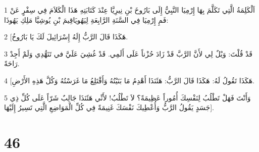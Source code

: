 \par 1 اَلْكَلِمَةُ الَّتِي تَكَلَّمَ بِهَا إِرْمِيَا النَّبِيُّ إِلَى بَارُوخَ بْنِ نِيرِيَّا عِنْدَ كَتَابَتِهِ هَذَا الْكَلاَمَ فِي سِفْرٍ عَنْ فَمِ إِرْمِيَا فِي السَّنَةِ الرَّابِعَةِ لِيَهُويَاقِيمَ بْنِ يُوشِيَّا مَلِكِ يَهُوذَا:
\par 2 [هَكَذَا قَالَ الرَّبُّ إِلَهُ إِسْرَائِيلَ لَكَ يَا بَارُوخُ.
\par 3 قَدْ قُلْتَ: وَيْلٌ لِي لأَنَّ الرَّبَّ قَدْ زَادَ حُزْناً عَلَى أَلَمِي. قَدْ غُشِيَ عَلَيَّ في تَنَهُّدِي وَلَمْ أَجِدْ رَاحَةً.
\par 4 [هَكَذَا تَقُولُ لَهُ: هَكَذَا قَالَ الرَّبُّ: هَئَنَذَا أَهْدِمُ مَا بَنَيْتُهُ وَأَقْتَلِعُ مَا غَرَسْتُهُ وَكُلَّ هَذِهِ الأَرْضِ.
\par 5 وَأَنْتَ فَهَلْ تَطْلُبُ لِنَفْسِكَ أُمُوراً عَظِيمَةً؟ لاَ تَطْلُبُ! لأَنِّي هَئَنَذَا جَالِبٌ شَرّاً عَلَى كُلِّ ذِي جَسَدٍ يَقُولُ الرَّبُّ وَأُعْطِيكَ نَفْسَكَ غَنِيمَةً فِي كُلِّ الْمَوَاضِعِ الَّتِي تَسِيرُ إِلَيْهَا].

\chapter{46}

